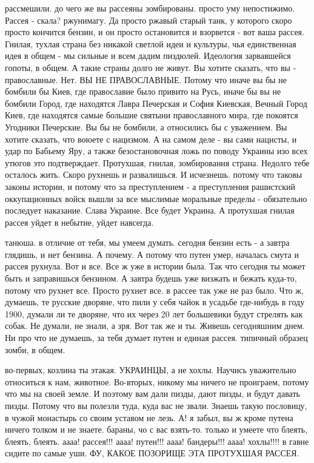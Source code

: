 рассмешили. до чего же вы рассеяны зомбированы. просто уму непостижимо. Рассея
- скала? ржунимагу. Да просто ржавый старый танк, у которого скоро просто
кончится бензин, и он просто остановится и взорвется - вот ваша рассея. Гнилая,
тухлая страна без никакой светлой идеи и культуры, чья единственная идея в
общем - мы сильные и всем дадим пиздюлей. Идеология зарвавшейся гопоты, в
общем. А такие страны долго не живут. Вы хотите сказать, что вы - православные.
Нет. ВЫ НЕ ПРАВОСЛАВНЫЕ. Потому что иначе вы бы не бомбили бы Киев, где
православие было привито на Русь, иначе бы вы не бомбили Город, где находятся
Лавра Печерская и София Киевская, Вечный Город Киев, где находятся самые
большие святыни православного мира, где покоятся Угодники Печерские. Вы бы не
бомбили, а относились бы с уважением. Вы хотите сказать, что воюете с нацизмом.
А на самом деле - вы сами нацисты, и удар по Бабьему Яру, а также
безостановочная ложь по поводу Украины изо всех утюгов это подтверждает.
Протухшая, гнилая, зомбировання страна. Недолго тебе осталось жить. Скоро
рухнешь и развалишься. И исчезнешь. потому что таковы законы истории, и потому
что за преступлением - а преступления рашистский оккупационных войск вышли за
все мыслимые моральные пределы - обязательно последует наказание. Слава
Украине. Все будет Украина. А протухшая гнилая рассея уйдет в небытие, уйдет
навсегда.

танюша. в отличие от тебя, мы умеем думать. сегодня бензин есть - а завтра
глядишь, и нет бензина. А почему. А потому что путен умер, началась смута и
рассея рухнула. Вот и все. Все ж уже в истории была. Так что сегодня ты может
быть и заправишься бензином. А завтра будешь уже визжать и бежать куда-то,
потому что рухнет все. Просто рухнет все. в рассее так уже не раз было. Что ж,
думаешь, те русские дворяне, что пили у себя чайок в усадьбе где-нибудь в году
1900, думали ли те дворяне, что их через 20 лет большевики будут стрелять как
собак. Не думали, не знали, а зря. Вот так же и ты. Живешь сегодняшним днем. Ни
про что не думаешь, за тебя думает путен и единая рассея. типичный образец
зомби, в общем.

во-первых, козлина ты этакая. УКРАИНЦЫ, а не хохлы. Научись уважительно
относиться к нам, животное. Во-вторых, никому мы ничего не проиграем, потому
что мы на своей земле. И поэтому вам дали пизды, дают пизды, и будут давать
пизды. Потому что вы полезли туда, куда вас не звали. Знаешь такую пословицу, в
чужой монастырь со своим уставом не лезь. А! я забыл, вы ж кроме путена ничего
толком и не знаете. бараны, чо с вас взять-то. только и умеете что блеять,
блеять, блеять. аааа! рассея!!! аааа! путен!!! аааа! бандеры!!! аааа! хохлы!!!!
в гавне сидите по самые уши. ФУ, КАКОЕ ПОЗОРИЩЕ ЭТА ПРОТУХШАЯ РАССЕЯ.

